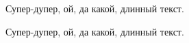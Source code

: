 \documentclass[
  12pt, %
  a4paper, %
  simple, %
  floatsection %
]{eskdtext}
\begin{document}
  

  \thispagestyle{fancyStyleWithCodeOnTopFirstPage}
  \pagestyle{fancyStyleWithCodeOnTop}
  
  Супер-дупер, ой, да какой, длинный текст.

  \newpage
  Супер-дупер, ой, да какой, длинный текст.
\end{document}
